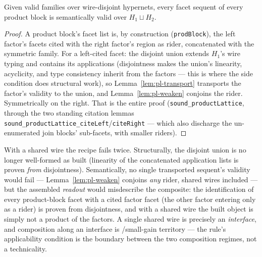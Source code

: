 \begin{bprop}
\label{prop:pl-sound}
Given valid families over wire-disjoint hypernets, every facet sequent
of every product block is semantically valid over
$H_1 \sqcup H_2$.
\end{bprop}
\begin{proof}
A product block's facet list is, by construction (\texttt{prodBlock}),
the left factor's facets cited with the right factor's region as
rider, concatenated with the symmetric family. For a left-cited facet:
the disjoint union extends $H_1$'s wire typing and contains its
applications (disjointness makes the union's linearity, acyclicity,
and type consistency inherit from the factors --- this is where the
side condition does structural work), so
Lemma~\ref{lem:pl-transport} transports the factor's validity to the
union, and Lemma~\ref{lem:pl-weaken} conjoins the rider. Symmetrically
on the right. That is the entire proof
(\texttt{sound\_productLattice}, through the two standing citation
lemmas \texttt{sound\_productLattice\_citeLeft}/\texttt{citeRight} ---
which also discharge the un-enumerated join blocks' sub-facets, with
smaller riders).
\end{proof}

\begin{bremark}
\label{rem:pl-disjoint}
With a shared wire the recipe fails twice. Structurally, the disjoint
union is no longer well-formed as built (linearity of the concatenated
application lists is proven \emph{from} disjointness). Semantically, no
single transported sequent's validity would fail ---
Lemma~\ref{lem:pl-weaken} conjoins \emph{any} rider, shared wires
included --- but the assembled \emph{readout} would misdescribe the
composite: the identification of every product-block facet with a
cited factor facet (the other factor entering only as a rider) is
proven from disjointness, and with a shared wire the built object is
simply not a product of the factors.
A single shared wire is precisely an \emph{interface}, and composition
along an interface is /small-gain territory --- the
rule's applicability condition is the boundary between the two
composition regimes, not a technicality.
\end{bremark}


